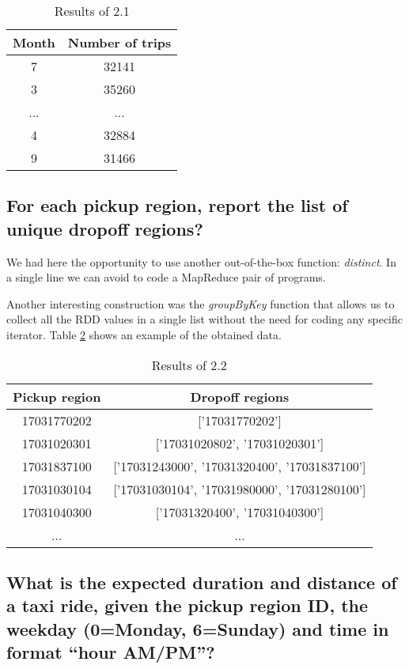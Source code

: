 \documentclass[conference,compsoc]{IEEEtran}
\begin{document}
\begin{table}[!t]
\renewcommand{\arraystretch}{1.3}
\caption{Results of 2.1}
\label{output_2_1}
\centering
\begin{tabular}{c||c}
\hline
\bfseries Month & \bfseries Number of trips\\
\hline\hline

7 &32141\\
3 &35260\\
... & ...\\
4 &32884\\
9 &31466\\
\hline
\end{tabular}
\end{table}

\subsection{For each pickup region, report the list of unique dropoff regions?}
We had here the opportunity to use another out-of-the-box function: \textit{distinct}. In a single line we can avoid to code a MapReduce pair of programs. \par Another interesting construction was the \textit{groupByKey} function that allows us to collect all the RDD values in a single list without the need for coding any specific iterator.  Table \ref{output_2_2} shows an example of the obtained data.

\begin{table}[!t]
\renewcommand{\arraystretch}{1.3}
\caption{Results of 2.2}
\label{output_2_2}
\centering
\begin{tabular}{c||c}
\hline
\bfseries Pickup region & \bfseries Dropoff regions\\
\hline\hline

17031770202 &['17031770202']\\
17031020301 &['17031020802', '17031020301']\\
17031837100 &['17031243000', '17031320400', '17031837100']\\
17031030104 &['17031030104', '17031980000', '17031280100']\\
17031040300 &['17031320400', '17031040300']\\
... &...\\
\hline
\end{tabular}
\end{table}

\subsection{What is the expected duration and distance of a taxi ride, given the pickup region ID, the weekday (0=Monday, 6=Sunday) and time in format “hour AM/PM”?}
\end{document}
